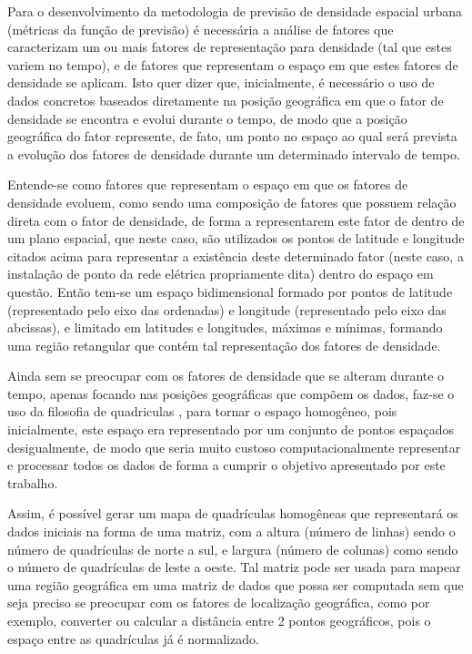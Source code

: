 Para o desenvolvimento da metodologia de previsão de densidade espacial urbana (métricas da função de previsão) é necessária a análise de fatores que caracterizam um ou mais fatores de representação para densidade (tal que estes variem no tempo), e de fatores que representam o espaço em que estes fatores de densidade se aplicam. Isto quer dizer que, inicialmente, é necessário o uso de dados concretos baseados diretamente na posição geográfica em que o fator de densidade se encontra e evolui durante o tempo, de modo que a posição geográfica do fator represente, de fato, um ponto no espaço ao qual será prevista a evolução dos fatores de densidade durante um determinado intervalo de tempo.

Entende-se como fatores que representam o espaço em que os fatores de densidade evoluem, como sendo uma composição de fatores que possuem relação direta com o fator de densidade, de forma a representarem este fator de dentro de um plano espacial, que neste caso, são utilizados os pontos de latitude e longitude citados acima para representar a existência deste determinado fator (neste caso, a instalação de ponto da rede elétrica propriamente dita) dentro do espaço em questão. Então tem-se um espaço bidimensional formado por pontos de latitude (representado pelo eixo das ordenadas) e longitude (representado pelo eixo das abcissas), e limitado em latitudes e longitudes, máximas e mínimas, formando uma região retangular que contém tal representação dos fatores de densidade.

Ainda sem se preocupar com os fatores de densidade que se alteram durante o tempo, apenas focando nas posições geográficas que compõem os dados, faz-se o uso da filosofia de quadriculas \cite{willis2002spatial}, para tornar o espaço homogêneo, pois inicialmente, este espaço era representado por um conjunto de pontos espaçados desigualmente, de modo que seria muito custoso computacionalmente representar e processar todos os dados de forma a cumprir o objetivo apresentado por este trabalho.

Assim, é possível gerar um mapa de quadrículas homogêneas que representará os dados iniciais na forma de uma matriz, com a altura (número de linhas) sendo o número de quadrículas de norte a sul, e largura (número de colunas) como sendo o número de quadrículas de leste a oeste. Tal matriz pode ser usada para mapear uma região geográfica em uma matriz de dados que possa ser computada sem que seja preciso se preocupar com os fatores de localização geográfica, como por exemplo, converter ou calcular a distância entre 2 pontos geográficos, pois o espaço entre as quadrículas já é normalizado.

